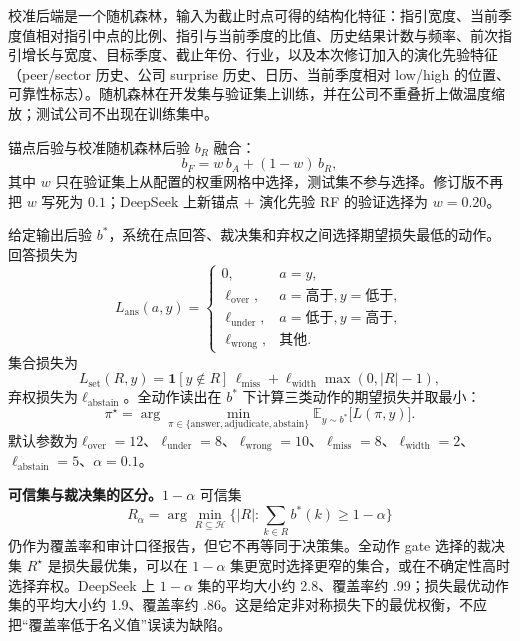 校准后端是一个随机森林，输入为截止时点可得的结构化特征：指引宽度、当前季度值相对指引中点的比例、指引与当前季度的比值、历史结果计数与频率、前次指引增长与宽度、目标季度、截止年份、行业，以及本次修订加入的演化先验特征（peer/sector 历史、公司 surprise 历史、日历、当前季度相对 low/high 的位置、可靠性标志）。随机森林在开发集与验证集上训练，并在公司不重叠折上做温度缩放；测试公司不出现在训练集中。

锚点后验与校准随机森林后验 $b_R$ 融合：
\begin{equation}
b_F=w\,b_A+(1-w)\,b_R,
\end{equation}
其中 $w$ 只在验证集上从配置的权重网格中选择，测试集不参与选择。修订版不再把 $w$ 写死为 $0.1$；DeepSeek 上新锚点 + 演化先验 RF 的验证选择为 $w=0.20$。

给定输出后验 $b^\ast$，系统在点回答、裁决集和弃权之间选择期望损失最低的动作。回答损失为
\begin{equation}
L_{\text{ans}}(a,y)=
\begin{cases}
0, & a=y,\\
\ell_{\text{over}}, & a=\text{高于},y=\text{低于},\\
\ell_{\text{under}}, & a=\text{低于},y=\text{高于},\\
\ell_{\text{wrong}}, & \text{其他}.
\end{cases}
\end{equation}
集合损失为
\begin{equation}
L_{\text{set}}(R,y)=\mathbf{1}[y\notin R]\,\ell_{\text{miss}}
+\ell_{\text{width}}\max(0,|R|-1),
\end{equation}
弃权损失为$\ell_{\text{abstain}}$。全动作读出在 $b^\ast$ 下计算三类动作的期望损失并取最小：
\begin{equation}
\pi^\star=\arg\min_{\pi\in\{\text{answer},\text{adjudicate},\text{abstain}\}}
\mathbb E_{y\sim b^\ast}\big[L(\pi,y)\big].
\end{equation}
默认参数为$\ell_{\text{over}}=12$、$\ell_{\text{under}}=8$、$\ell_{\text{wrong}}=10$、$\ell_{\text{miss}}=8$、$\ell_{\text{width}}=2$、$\ell_{\text{abstain}}=5$、$\alpha=0.1$。

\begin{revbox}
\noindent\textbf{可信集与裁决集的区分。}$1-\alpha$ 可信集
\begin{equation}
R_\alpha=\arg\min_{R\subseteq\mathcal H}\{|R|:\textstyle\sum_{k\in R}b^\ast(k)\ge 1-\alpha\}
\end{equation}
仍作为覆盖率和审计口径报告，但它不再等同于决策集。全动作 gate 选择的裁决集 $R^\star$ 是损失最优集，可以在 $1-\alpha$ 集更宽时选择更窄的集合，或在不确定性高时选择弃权。DeepSeek 上 $1-\alpha$ 集的平均大小约 2.8、覆盖率约 .99；损失最优动作集的平均大小约 1.9、覆盖率约 .86。这是给定非对称损失下的最优权衡，不应把“覆盖率低于名义值”误读为缺陷。
\end{revbox}

